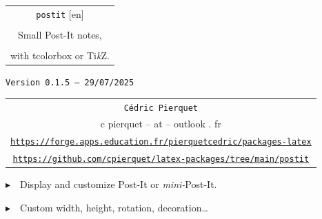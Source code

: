 \documentclass[english,a4paper,11pt]{article}
\def\TPversion{0.1.5}
\def\TPdate{29/07/2025}
\begin{document}
\setlength{\aweboxleftmargin}{0.07\linewidth}
\setlength{\aweboxcontentwidth}{0.93\linewidth}
\setlength{\aweboxvskip}{8pt}

\pagestyle{fancy}

\thispagestyle{empty}

\vspace{2cm}

\begin{center}
	\begin{minipage}{0.75\linewidth}
	\begin{tcolorbox}[colframe=yellow,colback=yellow!15]
		\begin{center}
			\begin{tabular}{c}
				{\Huge \texttt{postit} [en]}\\
				\\
				{\LARGE Small Post-It notes,} \\
				\\
				{\LARGE with \textsf{tcolorbox} or \textsf{Ti\textit{k}Z}.} \\
			\end{tabular}
			
			\bigskip
			
			{\small \texttt{Version \TPversion{} -- \TPdate}}
		\end{center}
	\end{tcolorbox}
\end{minipage}
\end{center}

\begin{center}
	\begin{tabular}{c}
	\texttt{Cédric Pierquet}\\
	{\ttfamily c pierquet -- at -- outlook . fr}\\
	\texttt{\url{https://forge.apps.education.fr/pierquetcedric/packages-latex}}\\
	\texttt{\url{https://github.com/cpierquet/latex-packages/tree/main/postit}}
\end{tabular}
\end{center}

\vspace{0.25cm}

{$\blacktriangleright$~~Display and customize Post-It or \textit{mini-}Post-It.}

\vspace{0.25cm}

{$\blacktriangleright$~~Custom width, height, rotation, decoration\ldots}

\vspace{1cm}
\end{document}
